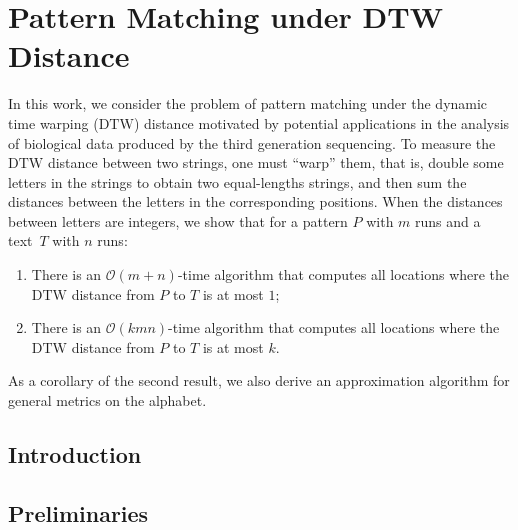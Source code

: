 \chapter{Pattern Matching under DTW Distance}

\providecommand{\norm}[1]{\ensuremath{\lVert#1\rVert}}
\providecommand{\ceil}[1]{\ensuremath{\lceil#1\rceil}}
\newcommand{\dtw}{\mathrm{DTW}}
\newcommand{\ham}{\mathrm{HAM}}
\providecommand{\dd}{\mathinner{.\,.\allowbreak}}
\providecommand{\RLE}{\mathrm{RLE}}
\providecommand{\Oh}{\mathcal{O}}
\providecommand{\eps}{\varepsilon}
\newcommand{\invacker}{\alpha}

\newcommand{\inputDTW}[1]{}
\newcommand{\figDTW}[2]{\texttt{[image: Part\_Two/dtw/\#2]}}

\begin{small}
In this work, we consider the problem of pattern matching under the dynamic time warping ($\dtw$) distance motivated by potential applications in the analysis of biological data produced by the third generation sequencing. To measure the $\dtw$ distance between two strings, one must ``warp'' them, that is, double some letters in the strings to obtain two equal-lengths strings, and then sum the distances between the letters in the corresponding positions. When the distances between letters are integers, we show that for a pattern $P$ with $m$ runs and a text~$T$ with $n$ runs:
\begin{enumerate}
\item There is an $\Oh(m+n)$-time algorithm that computes all locations where the $\dtw$ distance from $P$ to $T$ is at most $1$;
\item There is an $\Oh(kmn)$-time algorithm that computes all locations where the $\dtw$ distance from $P$ to $T$ is at most $k$.
\end{enumerate}
As a corollary of the second result, we also derive an approximation algorithm for general metrics on the alphabet. 
\end{small}

\section{Introduction}
\inputDTW{intro}

\section{Preliminaries}\label{dtw:sec:prelim}
\inputDTW{prelim}

